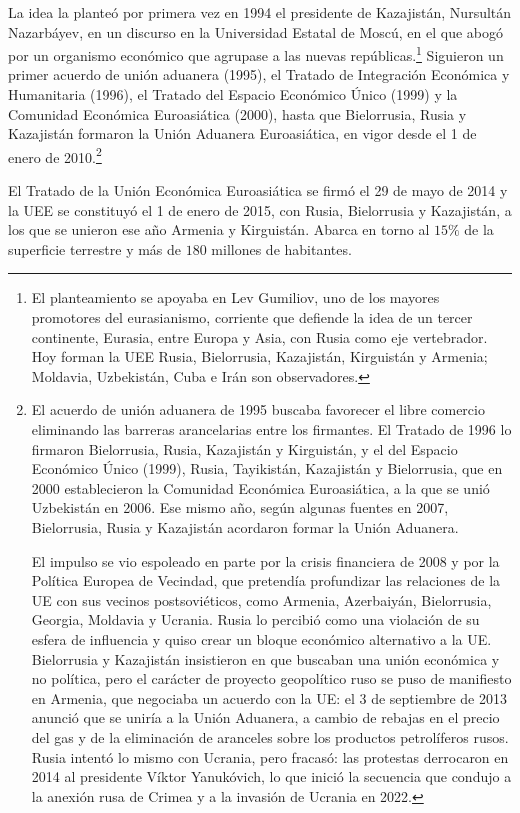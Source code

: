 \documentclass[10pt,a4paper]{article}
\begin{document}
La idea la planteó por primera vez en 1994 el presidente de Kazajistán, Nursultán Nazarbáyev, en un discurso en la Universidad Estatal de Moscú, en el que abogó por un organismo económico que agrupase a las nuevas repúblicas.\footnote{%
    El planteamiento se apoyaba en Lev Gumiliov, uno de los mayores promotores del eurasianismo, corriente que defiende la idea de un tercer continente, Eurasia, entre Europa y Asia, con Rusia como eje vertebrador. Hoy forman la UEE Rusia, Bielorrusia, Kazajistán, Kirguistán y Armenia; Moldavia, Uzbekistán, Cuba e Irán son observadores.
} Siguieron un primer acuerdo de unión aduanera (1995), el Tratado de Integración Económica y Humanitaria (1996), el Tratado del Espacio Económico Único (1999) y la Comunidad Económica Euroasiática (2000), hasta que Bielorrusia, Rusia y Kazajistán formaron la Unión Aduanera Euroasiática, en vigor desde el 1 de enero de 2010.\footnote{%
    El acuerdo de unión aduanera de 1995 buscaba favorecer el libre comercio eliminando las barreras arancelarias entre los firmantes. El Tratado de 1996 lo firmaron Bielorrusia, Rusia, Kazajistán y Kirguistán, y el del Espacio Económico Único (1999), Rusia, Tayikistán, Kazajistán y Bielorrusia, que en 2000 establecieron la Comunidad Económica Euroasiática, a la que se unió Uzbekistán en 2006. Ese mismo año, según algunas fuentes en 2007, Bielorrusia, Rusia y Kazajistán acordaron formar la Unión Aduanera.

    El impulso se vio espoleado en parte por la crisis financiera de 2008 y por la Política Europea de Vecindad, que pretendía profundizar las relaciones de la UE con sus vecinos postsoviéticos, como Armenia, Azerbaiyán, Bielorrusia, Georgia, Moldavia y Ucrania. Rusia lo percibió como una violación de su esfera de influencia y quiso crear un bloque económico alternativo a la UE. Bielorrusia y Kazajistán insistieron en que buscaban una unión económica y no política, pero el carácter de proyecto geopolítico ruso se puso de manifiesto en Armenia, que negociaba un acuerdo con la UE: el 3 de septiembre de 2013 anunció que se uniría a la Unión Aduanera, a cambio de rebajas en el precio del gas y de la eliminación de aranceles sobre los productos petrolíferos rusos. Rusia intentó lo mismo con Ucrania, pero fracasó: las protestas derrocaron en 2014 al presidente Víktor Yanukóvich, lo que inició la secuencia que condujo a la anexión rusa de Crimea y a la invasión de Ucrania en 2022.
} 

El Tratado de la Unión Económica Euroasiática se firmó el 29 de mayo de 2014 y la UEE se constituyó el 1 de enero de 2015, con Rusia, Bielorrusia y Kazajistán, a los que se unieron ese año Armenia y Kirguistán. Abarca en torno al $15\%$ de la superficie terrestre y más de $180$ millones de habitantes.
\end{document}
